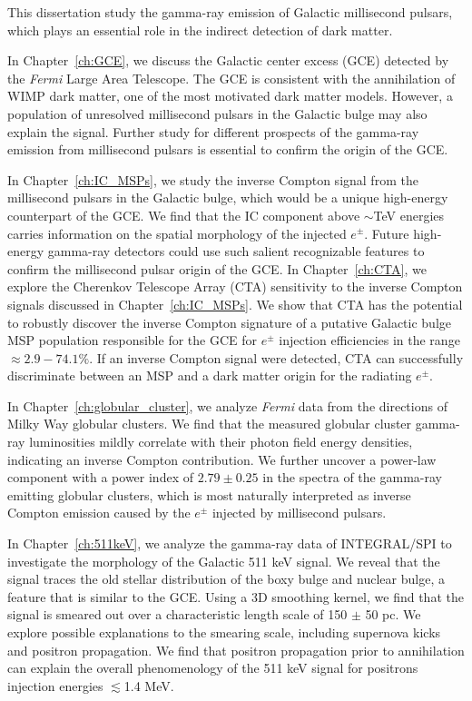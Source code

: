 \documentclass[doublespace,nopageskip]{VTthesis}
\begin{document}
This dissertation study the gamma-ray emission of Galactic millisecond pulsars, which plays an essential role in the indirect detection of dark matter. 

In Chapter~\ref{ch:GCE}, we discuss the Galactic center excess (GCE) detected by the \textit{Fermi} Large Area Telescope. The GCE is consistent with the annihilation of WIMP dark matter, one of the most motivated dark matter models. However, a population of unresolved millisecond pulsars in the Galactic bulge may also explain the signal. Further study for different prospects of the gamma-ray emission from millisecond pulsars is essential to confirm the origin of the GCE.


In Chapter~\ref{ch:IC_MSPs}, we study the inverse Compton signal from the millisecond pulsars in the Galactic bulge, which would be a unique high-energy counterpart of the GCE. We find that the IC component above $\sim$TeV energies carries information on the spatial morphology of the injected $e^\pm$. Future high-energy gamma-ray detectors could use such salient recognizable features to confirm the millisecond pulsar origin of the GCE. In Chapter~\ref{ch:CTA}, we explore the Cherenkov Telescope Array (CTA) sensitivity to the inverse Compton signals discussed in Chapter~\ref{ch:IC_MSPs}. We show that CTA has the potential to robustly discover the inverse Compton signature of a putative
Galactic bulge MSP population responsible for the GCE for $e^\pm$ injection efficiencies in the range $\approx 2.9 - 74.1\%$. If an inverse Compton signal were detected, CTA can successfully discriminate between an MSP and a dark matter origin for the radiating $e^\pm$.

In Chapter~\ref{ch:globular_cluster}, we analyze \textit{Fermi} data from the directions of Milky Way globular clusters. We find that the measured globular cluster gamma-ray luminosities mildly correlate with their photon field energy densities, indicating an inverse Compton contribution. We further uncover a power-law component with a power index of $2.79 \pm 0.25$ in the spectra of the gamma-ray emitting globular clusters, which is most naturally interpreted as inverse Compton emission caused by the $e^\pm$ injected by millisecond pulsars.

In Chapter~\ref{ch:511keV}, we analyze the gamma-ray data of INTEGRAL/SPI to investigate the morphology of the Galactic 511 keV signal. We reveal that the signal traces the old stellar distribution of the boxy bulge and nuclear bulge, a feature that is similar to the GCE. Using a 3D smoothing kernel, we find that the signal is smeared out over a characteristic length scale of 150 $\pm$ 50 pc. We explore possible explanations to the smearing scale, including supernova kicks and positron propagation. We find that positron propagation prior to annihilation can explain the overall phenomenology of the 511 keV signal for positrons injection energies $\lesssim$1.4 MeV.
\end{document}
